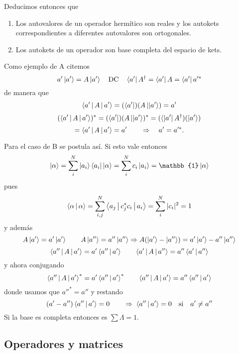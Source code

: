 \documentclass[10pt,oneside]{CBFT_book}
\begin{document}
Deducimos entonces que
\begin{enumerate}
 \item Los autovalores de un operador hermítico son reales y los autokets correspondientes a diferentes
 autovalores son ortogonales.
 \item Los autokets de un operador son base completa del espacio de kets.
\end{enumerate}

Como ejemplo de A citemos
\[
	a'\Ket{a'} = A\Ket{a'} \quad \text{DC} \quad \Bra{a'} A^{\dagger} = \Bra{a'} A = \Bra{a'}a'^*
\]
de manera que 
\[
	\Braket{a'|A|a'} = ( \Bra{a'} )( A\Ket{|a'} ) = a'
\]
\[
	( \Braket{a'|A|a'} )^* = ( \Bra{a'} )( A\Ket{|a'} )^* = ( \Bra{|a'}A^\dagger )( \Ket{a'} )
\]
\[
	= \Braket{a'|A|a'} = a' \qquad \Rightarrow \quad a' = a'^*.
\]

Para el caso de B se postula así. Si esto vale entonces 
\[
	\Ket{\alpha} = \sum_i^N \Ket{a_i}\Bra{a_i} \Ket{\alpha} = \sum_i^N c_i \Ket{a_i} = 
	\mathbb{1}\Ket{\alpha}
\]
pues 
\[
	\Braket{\alpha|\alpha} = \sum_{i,j}^N \Braket{ a_j|c_j^* c_i|a_i} = \sum_i^N |c_i|^2 = 1
\]
y además 
\[
	A\Ket{a'} = a'\Ket{a'} \qquad A\Ket{a''} = a''\Ket{a''} \Rightarrow 
	A(\Ket{a'} - \Ket{a''} ) = a'\Ket{a'} - a''\Ket{a''}
\]
\[
	\Braket{ a''|A|a' } = a' \Braket{ a''|a' } \qquad \Braket{ a'|A|a'' } = a'' \Braket{ a'|a'' }
\]
y ahora conjugando
\[
	\Braket{ a''|A|a' }^* = a' \Braket{ a''|a' }^* \qquad \Braket{ a''|A|a' } = a'' \Braket{ a''|a' }
\]
donde usamos que $a''^* = a''$ y restando 
\[
	(a'-a'')\Braket{a''|a'} = 0 \qquad \Rightarrow \; \Braket{a''|a'} = 0 
		\quad \text{si} \quad a'\neq a''
\]
Si la base es completa entonces es $\sum \Lambda = 1$.

\subsection{Operadores y matrices}
\end{document}
